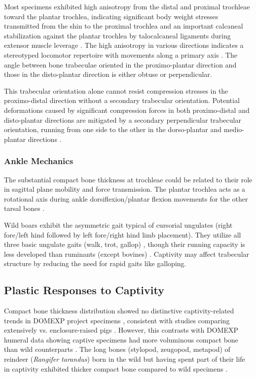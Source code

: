 \documentclass[12pt,a4paper]{article}
\begin{document}
Most specimens exhibited high anisotropy from the distal and proximal trochleae toward the plantar trochlea, indicating significant body weight stresses transmitted from the shin to the proximal trochlea and an important calcaneal stabilization against the plantar trochlea by talocalcaneal ligaments during extensor muscle leverage \cite{barrFunctionalMorphologyBovid2014o}.
The high anisotropy in various directions indicates a stereotyped locomotor repertoire with movements along a primary axis \cite{suTrabecularBoneAnisotropy2013}. The angle between bone trabeculae oriented in the proximo-plantar direction and those in the disto-plantar direction is either obtuse or perpendicular. 

This trabecular orientation alone cannot resist compression stresses in the proximo-distal direction without a secondary trabecular orientation. Potential deformations caused by significant compression forces in both proximo-distal and disto-plantar directions are mitigated by a secondary perpendicular trabecular orientation, running from one side to the other in the dorso-plantar and medio-plantar directions \cite{curreyBonesStructureMechanics2013b}.

\subsubsection{Ankle Mechanics}
The substantial compact bone thickness at trochleae could be related to their role in sagittal plane mobility and force transmission. The plantar trochlea acts as a rotational axis during ankle dorsiflexion/plantar flexion movements for the other tarsal bones \cite{barrFunctionalMorphologyBovid2014o,schaefferNotesOriginFunction1947u,
grimshawC6Levers2006}.

Wild boars exhibit the asymmetric gait typical of cursorial ungulates (right fore/left hind followed by left fore/right hind limb placement). They utilize all three basic ungulate gaits (walk, trot, gallop) \cite{hildebrandAnalysisAsymmetricalGaits1977}, though their running capacity is less developed than ruminants (except bovines) \cite{mayerWildPigsBiology2009}. Captivity may affect trabecular structure by reducing the need for rapid gaits like galloping.

\subsection{Plastic Responses to Captivity}
Compact bone thickness distribution showed no distinctive captivity-related trends in DOMEXP project specimens \cite{cottereauCanGrowthCaptivity2023ab}, consistent with studies comparing extensively vs. enclosure-raised pigs \cite{mainlandMacroMicromorphologicalFeatures2007t}. However, this contrasts with DOMEXP humeral data showing captive specimens had more voluminous compact bone than wild counterparts \cite{harbersInvestigatingImpactCaptivity2020ab}. The long bones (stylopod, zeugopod, metapod) of reindeer (\textit{Rangifer tarandus}) born in the wild but having spent part of their life in captivity exhibited thicker compact bone compared to wild specimens \cite{pelletierInfluenceCaptivitySelection2021d}.
\end{document}
